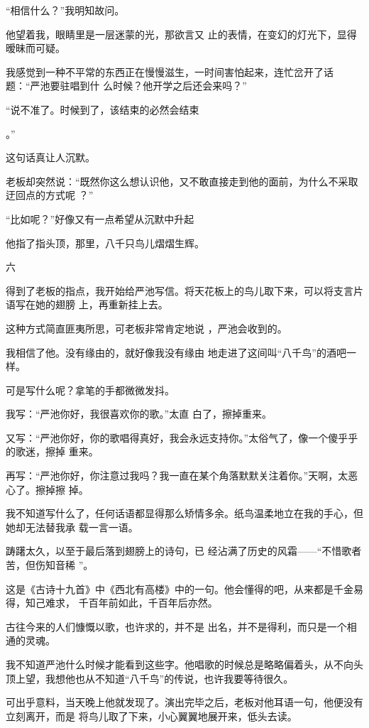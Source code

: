 \documentclass{article}
\begin{document}
“相信什么？”我明知故问。 

他望着我，眼睛里是一层迷蒙的光，那欲言又
止的表情，在变幻的灯光下，显得暧昧而可疑。 

我感觉到一种不平常的东西正在慢慢滋生，一时间害怕起来，连忙岔开了话题：“严池要驻唱到什
么时候？他开学之后还会来吗？” 

“说不准了。时候到了，该结束的必然会结束
\newpage

。” 


这句话真让人沉默。 

老板却突然说：“既然你这么想认识他，又不敢直接走到他的面前，为什么不采取迂回点的方式呢
？” 

“比如呢？”好像又有一点希望从沉默中升起

他指了指头顶，那里，八千只鸟儿熠熠生辉。


六 

得到了老板的指点，我开始给严池写信。将天花板上的鸟儿取下来，可以将支言片语写在她的翅膀
上，再重新挂上去。 

这种方式简直匪夷所思，可老板非常肯定地说
，严池会收到的。 

\newpage

我相信了他。没有缘由的，就好像我没有缘由
地走进了这间叫“八千鸟”的酒吧一样。 


可是写什么呢？拿笔的手都微微发抖。　　 

我写：“严池你好，我很喜欢你的歌。”太直
白了，擦掉重来。 

又写：“严池你好，你的歌唱得真好，我会永远支持你。”太俗气了，像一个傻乎乎的歌迷，擦掉
重来。 

再写：“严池你好，你注意过我吗？我一直在某个角落默默关注着你。”天啊，太恶心了。擦掉擦
掉。 

我不知道写什么了，任何话语都显得那么矫情多余。纸鸟温柔地立在我的手心，但她却无法替我承
载一言一语。 

踌躇太久，以至于最后落到翅膀上的诗句，已
\newpage
经沾满了历史的风霜——“不惜歌者苦，但伤知音稀
”。 

这是《古诗十九首》中《西北有高楼》中的一句。他会懂得的吧，从来都是千金易得，知己难求，
千百年前如此，千百年后亦然。 

古往今来的人们慷慨以歌，也许求的，并不是
出名，并不是得利，而只是一个相通的灵魂。 

我不知道严池什么时候才能看到这些字。他唱歌的时候总是略略偏着头，从不向头顶上望，我想他也从不知道“八千鸟”的传说，也许我要等待很久。

可出乎意料，当天晚上他就发现了。演出完毕之后，老板对他耳语一句，他便没有立刻离开，而是
将鸟儿取了下来，小心翼翼地展开来，低头去读。 
\end{document}
